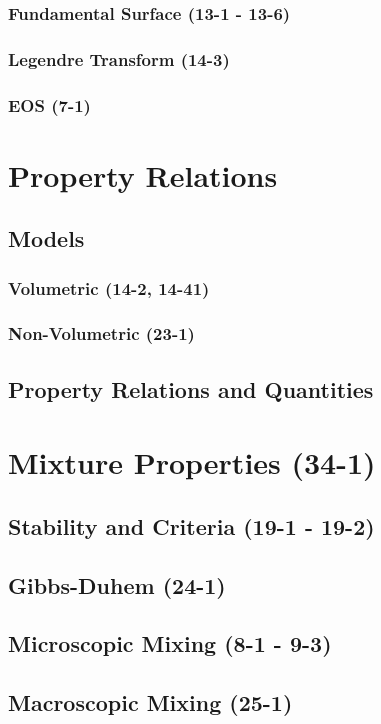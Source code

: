 \documentclass{mitqualif}
\begin{document}
\subsubsection{Fundamental Surface (13-1 - 13-6)}
\subsubsection{Legendre Transform (14-3)}
\subsubsection{EOS (7-1)}

\section{Property Relations}
\subsection{Models}
\subsubsection{Volumetric (14-2, 14-41)}
\subsubsection{Non-Volumetric (23-1)}
\subsection{Property Relations and Quantities}
\section{Mixture Properties (34-1)}
\subsection{Stability and Criteria (19-1 - 19-2)}
\subsection{Gibbs-Duhem (24-1)}
\subsection{Microscopic Mixing (8-1 - 9-3)}


\subsection{Macroscopic Mixing (25-1)}
\end{document}

